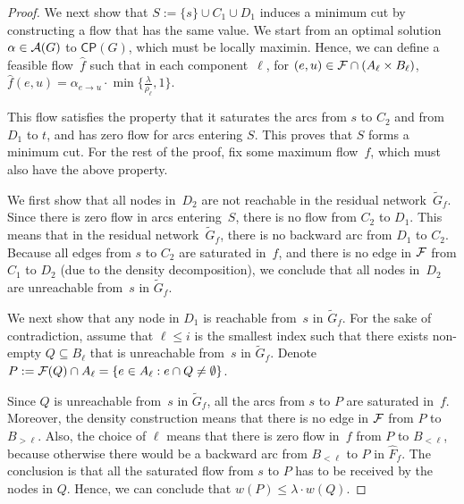 \begin{proof}
We next show that $S := \{s\} \cup C_1 \cup D_1$ induces a
minimum cut by constructing a flow that has the same value.
We start from an optimal solution $\alpha \in \mathcal {A}(G)$
to $\mathsf{CP}(G)$, which must be locally maximin.
Hence, 
we can define a feasible flow~$\widehat{f}$ such that 
in each component~$\ell$, 
for $(e, u) \in \mathcal {F} \cap (A_\ell \times B_\ell)$,
$\widehat{f}(e,u) = \alpha_{e \to u} \cdot \min\{\frac{\lambda}{\rho_\ell}, 1\}$.

This flow satisfies the property that
it saturates the arcs from $s$ to $C_2$
and from $D_1$ to $t$, and has zero flow for
arcs entering $S$. This proves that 
$S$ forms a minimum cut. 
For the rest of the proof, fix some maximum flow~$f$,
which must also have the above property.


We first show that all nodes in~$D_2$ are not reachable
in the residual network~$\widetilde{G}_f$.
Since there is zero flow in arcs entering~$S$,
there is no flow
from $C_2$ to $D_1$.  This means that in the residual network~$\widetilde{G}_f$, there is no backward arc from $D_1$ to $C_2$.
Because all edges from $s$ to $C_2$ are saturated in~$f$,
and there is no edge in $\mathcal {F}$ from $C_1$ to $D_2$ (due to
the density decomposition),
we conclude that all nodes in~$D_2$ are unreachable from~$s$
in $\widetilde{G}_f$.

We next show that any node in $D_1$ is reachable from~$s$
in $\widetilde{G}_f$. For the sake of contradiction,
assume that $\ell \leq i$ is the smallest index
such that there exists non-empty $Q \subseteq B_\ell$
that is unreachable from~$s$ in $\widetilde{G}_f$.
Denote $P := \mathcal {F}(Q) \cap A_\ell
= \{e \in A_\ell: e \cap Q \neq \emptyset\}$.

Since $Q$ is unreachable from~$s$ in $\widetilde{G}_f$,
all the arcs from $s$ to $P$ are saturated in~$f$.
Moreover, the density construction means
that there is no edge in $\mathcal {F}$ from $P$
to $B_{>\ell}$. Also, the choice of $\ell$
means that there is zero flow in~$f$ from $P$ to
$B_{<\ell}$, because otherwise
there would be a backward arc from $B_{<\ell}$ to $P$ in $\widehat{F}_f$.
The conclusion is that all the saturated flow
from $s$ to $P$ has to be received by the nodes in $Q$.
Hence, we can conclude that
$w(P) \leq \lambda \cdot w(Q)$.


\end{proof}
